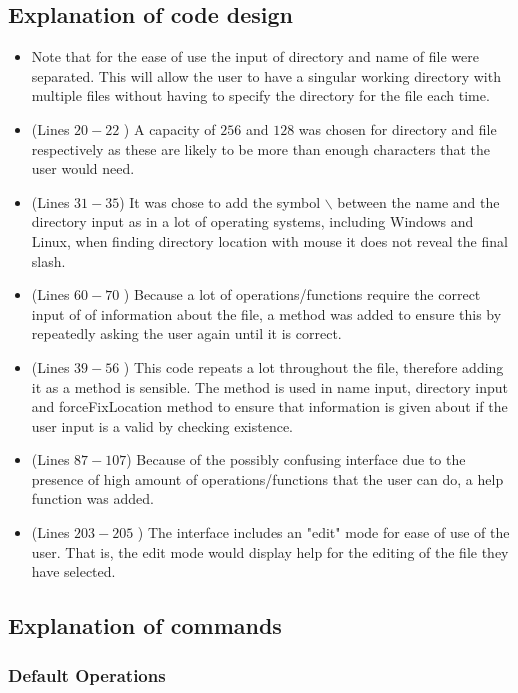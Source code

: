 \documentclass[a4paper]{article}
\theoremstyle{plain}
\theoremstyle{definition}
\theoremstyle{remark}
\begin{document}
\subsection{Explanation of code design}
\begin{itemize}
	\item Note that for the ease of use the input of directory and name of file were separated. This will allow the user to have a singular working directory with multiple files without having to specify the directory for the file each time.
	\item (Lines $20-22$ ) A capacity of $256$ and $128$ was chosen for directory and file respectively as these are likely to be more than enough characters that the user would need.
	\item (Lines $31-35$) It was chose to add the symbol $\backslash$ between the name and the directory input as in a lot of operating systems, including Windows and Linux, when finding directory location with mouse it does not reveal the final slash.
	\item (Lines $60-70$ ) Because a lot of operations/functions require the correct input of of information about the file, a method was added to ensure this by repeatedly asking the user again until it is correct.
	\item (Lines $39-56$ ) This code repeats a lot throughout the file, therefore adding it as a method is sensible. The method is used in name input, directory input and forceFixLocation method to ensure that information is given about if the user input is a valid by checking existence.
	\item (Lines $87-107$) Because of the possibly confusing interface due to the presence of high amount of operations/functions that the user can do, a help function was added.
	\item (Lines $203-205$ ) The interface includes an "edit" mode for ease of use of the user. That is, the edit mode would display help for the editing of the file they have selected.
	
\end{itemize}
\subsection{Explanation of commands}
\subsubsection{Default Operations}
\end{document}
